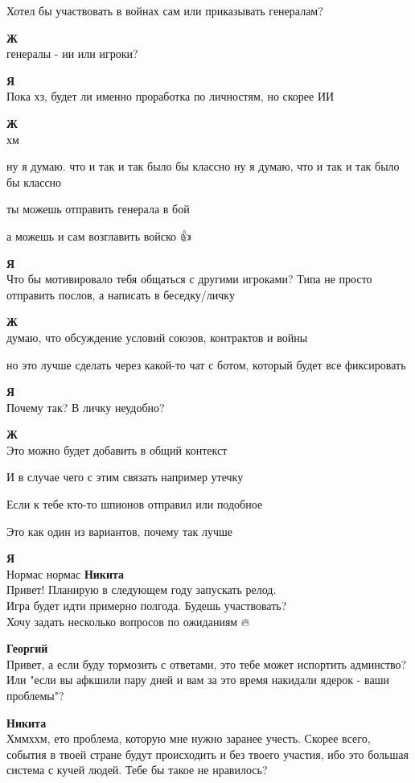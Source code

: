 \begin{tabbing}
Хотел бы участвовать в войнах сам или приказывать генералам?

\textbf{Ж} \\
генералы - ии или игроки?

\textbf{Я} \\
Пока хз, будет ли именно проработка по личностям, но скорее ИИ

\textbf{Ж} \\
хм

ну я думаю. что и так и так было бы классно
ну я думаю, что и так и так было бы классно

ты можешь отправить генерала в бой

а можешь и сам возглавить войско 👍🎅

\textbf{Я} \\
Что бы мотивировало тебя общаться с другими игроками? Типа не просто отправить послов, а написать в беседку/личку

\textbf{Ж} \\
думаю, что обсуждение условий союзов, контрактов и войны

но это лучше сделать через какой-то чат с ботом, который будет все фиксировать

\textbf{Я} \\
Почему так? В личку неудобно?

\textbf{Ж} \\
Это можно будет добавить в общий контекст

И в случае чего с этим связать например утечку

Если к тебе кто-то шпионов отправил или подобное

Это как один из вариантов, почему так лучше

\textbf{Я} \\
Нормас нормас
\textbf{Никита} \\
Привет! Планирую в следующем году запускать релод. \\
Игра будет идти примерно полгода. Будешь участвовать? \\
Хочу задать несколько вопросов по ожиданиям 🔥🎅

\textbf{Георгий} \\
Привет, а если буду тормозить с ответами, это тебе может испортить админство? Или "если вы афкшили пару дней и вам за это время накидали ядерок - ваши проблемы"?

\textbf{Никита} \\
Хммххм, ето проблема, которую мне нужно заранее учесть. Скорее всего, события в твоей стране будут происходить и без твоего участия, ибо это большая система с кучей людей. Тебе бы такое не нравилось?


\end{tabbing}
